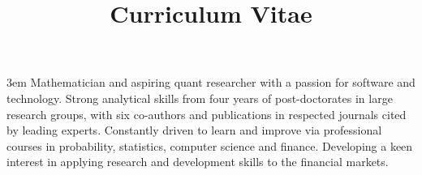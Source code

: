 \documentclass[a4paper,skipsamekey,11pt,english]{curve}
\title{Curriculum Vitae}
\newcommand{\myvert}{\vspace{-1.1em}}
\begin{document}
\emergencystretch 3em
\makeheaders[c]
Mathematician and aspiring quant researcher with a passion for software and technology. Strong analytical skills from four years of post-doctorates in large research groups, with six co-authors and publications in respected journals cited by leading experts. Constantly driven to learn and improve via professional courses in probability, statistics, computer science and finance.  Developing a keen interest in applying research and development skills to the financial markets. 

\myvert{}
\myvert{}

%
\myvert{}
\vspace{-0.2em}
\myvert{}

% 
\end{document}
